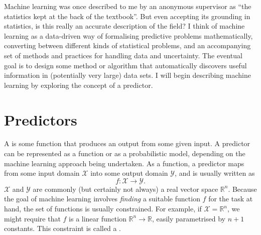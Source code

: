 
    Machine learning was once described to me by an anonymous supervisor as ``the statistics kept at the back of the textbook''. But even accepting its grounding in statistics, is this really an accurate description of the field? I think of machine learning as a data-driven way of formalising predictive problems mathematically, converting between different kinds of statistical problems, and an accompanying set of methods and practices for handling data and uncertainty. The eventual goal is to design some method or algorithm that automatically discovers useful information in (potentially very large) data sets. I will begin describing machine learning by exploring the concept of a predictor.
    

\section{Predictors}
\label{sec:predictors}

    A  is some function that produces an output from some given input. A predictor can be represented as a function or as a probabilistic model, depending on the machine learning approach being undertaken. As a function, a predictor maps from some input domain $\mathcal X$ into some output domain $\mathcal Y$, and is usually written as
    \begin{equation}
        f : \mathcal X \to \mathcal Y.
    \end{equation}
    $\mathcal X$ and $\mathcal Y$ are commonly (but certainly not always) a real vector space $\mathbb R^n$. Because the goal of machine learning involves \emph{finding} a suitable function $f$ for the task at hand, the set of functions is usually constrained. For example, if $\mathcal X = \mathbb{R}^n$, we might require that $f$ is a linear function $\mathbb R^n \to \mathbb R$, easily parametrised by $n + 1$ constants. This constraint is called a .

